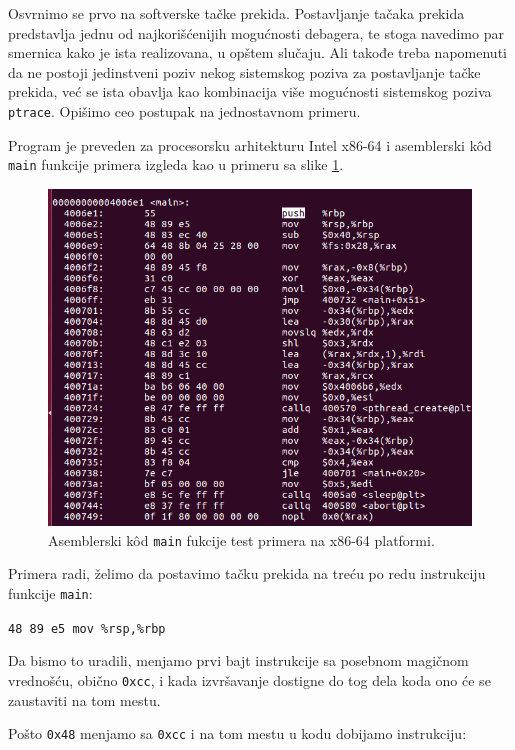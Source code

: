 \documentclass[12pt,oneside]{memoir}
\begin{document}
Osvrnimo se prvo na softverske tačke prekida. Postavljanje tačaka prekida predstavlja jednu od najkorišćenijih mogućnosti debagera, te stoga navedimo par smernica kako je ista realizovana, u opštem slučaju. Ali takođe treba napomenuti da ne postoji jedinstveni poziv nekog sistemskog poziva za postavljanje tačke prekida, već se ista obavlja kao kombinacija više mogućnosti  sistemskog poziva \texttt{ptrace}. Opišimo ceo postupak na jednostavnom primeru.

Program je preveden za procesorsku arhitekturu Intel x86-64 i asemblerski k\^{o}d \texttt{main} funkcije primera izgleda kao u primeru sa slike \ref{fig:primer1}.

\begin{figure}[h!]
	\begin{center}
		\includegraphics[scale=0.3]{slike/example_bp.png}
	\end{center}
	\caption{Asemblerski k\^{o}d \texttt{main} fukcije test primera na x86-64 platformi.}
	\label{fig:primer1}
\end{figure}

Primera radi, želimo da postavimo tačku prekida na treću po redu instrukciju funkcije \texttt{main}:

\texttt{48 89 e5  mov \%rsp,\%rbp}

Da bismo to uradili, menjamo prvi bajt instrukcije sa posebnom magičnom vrednošću, obično \texttt{0xcc}, i kada izvršavanje dostigne do tog dela koda ono će se zaustaviti na tom mestu.

Pošto \texttt{0x48} menjamo sa \texttt{0xcc} i na tom mestu u kodu dobijamo instrukciju:
\end{document}
